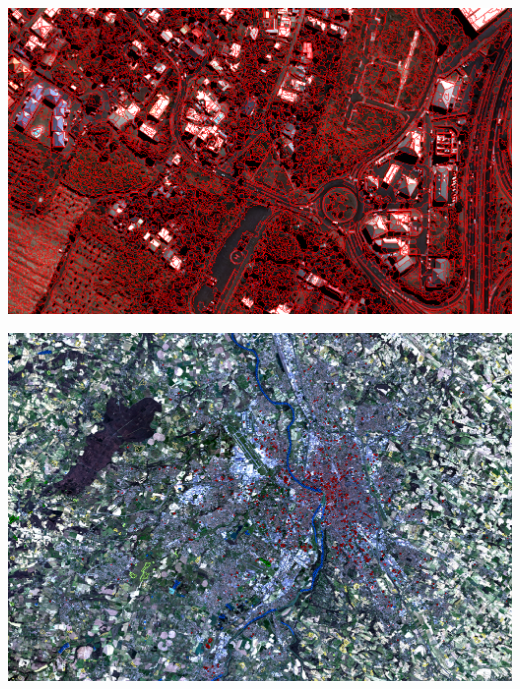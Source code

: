 \documentclass[smaller]{beamer}
\begin{document}
\vspace*{-6.5mm}
\begin{frame}[plain]
\hspace*{-11mm}
    \includegraphics[keepaspectratio,height=1.1\paperheight]{images/segmentation.png}
\end{frame}

\vspace*{-6.5mm}
\begin{frame}[plain]
\hspace*{-11mm}
    \includegraphics[keepaspectratio,height=1.1\paperheight]{../../Courses/org/WorkshopGuide/Images/samples_selection.png}
\end{frame}
\end{document}
